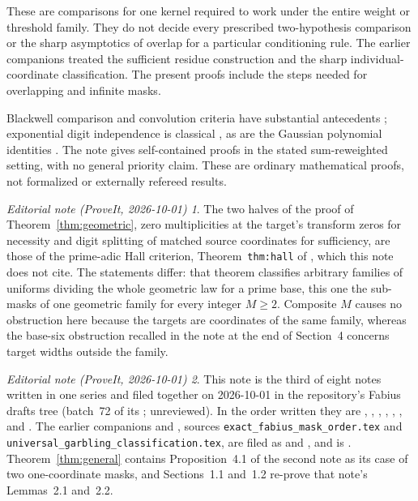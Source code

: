 \documentclass[11pt,a4paper]{article}
\theoremstyle{remark}\newtheorem*{ednote}{Editorial note (ProveIt, 2026-10-01)}
\begin{document}
These are comparisons for one kernel required to work under the entire weight or threshold family. They do not decide every prescribed two-hypothesis comparison or the sharp asymptotics of overlap for a particular conditioning rule. The earlier companions \cite{Modulo,Classification} treated the sufficient residue construction and the sharp individual-coordinate classification. The present proofs include the steps needed for overlapping and infinite masks.

Blackwell comparison and convolution criteria have substantial antecedents \cite{Blackwell,Torgersen}; exponential digit independence is classical \cite{Steutel}, as are the Gaussian polynomial identities \cite{DLMF}. The note gives self-contained proofs in the stated sum-reweighted setting, with no general priority claim. These are ordinary mathematical proofs, not formalized or externally refereed results.
\begin{ednote}
The two halves of the proof of Theorem~\ref{thm:geometric}, zero
multiplicities at the target's transform zeros for necessity and digit
splitting of matched source coordinates for sufficiency, are those of the
prime-adic Hall criterion, Theorem~\texttt{thm:hall} of
,
which this note does not cite. The statements differ: that theorem classifies
arbitrary families of uniforms dividing the whole geometric law for a prime
base, this one the sub-masks of one geometric family for every integer
$M\ge2$. Composite $M$ causes no obstruction here because the targets are
coordinates of the same family, whereas the base-six obstruction recalled in
the note at the end of Section~4 concerns target widths outside the family.
\end{ednote}
\begin{ednote}
This note is the third of eight notes written in one series and filed together on 2026-10-01 in the repository's Fabius drafts tree (batch~72 of its ; unreviewed). In the order written they are , , , , , ,  and . 
The earlier companions \cite{Modulo} and \cite{Classification}, sources
\texttt{exact\_fabius\_mask\_order.tex} and
\texttt{universal\_garbling\_classification.tex}, are filed as
 and
, and \cite{Repository} is
. Theorem~\ref{thm:general} contains Proposition~4.1 of
the second note as its case of two one-coordinate masks, and Sections~1.1
and~1.2 re-prove that note's Lemmas~2.1 and~2.2.
\end{ednote}
\end{document}
